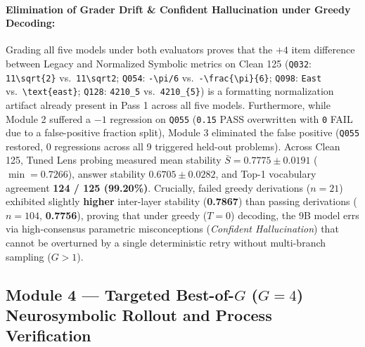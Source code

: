 \documentclass[11pt,a4paper]{article}
\begin{document}
\paragraph{Elimination of Grader Drift \& Confident Hallucination under Greedy Decoding:}
Grading all five models under both evaluators proves that the $+4$ item difference between Legacy and Normalized Symbolic metrics on Clean 125 (\texttt{Q032}: \texttt{11\textbackslash sqrt\{2\}} vs.\ \texttt{11\textbackslash sqrt2}; \texttt{Q054}: \texttt{-\textbackslash pi/6} vs.\ \texttt{-\textbackslash frac\{\textbackslash pi\}\{6\}}; \texttt{Q098}: \texttt{East} vs.\ \texttt{\textbackslash text\{east\}}; \texttt{Q128}: \texttt{4210\_5} vs.\ \texttt{4210\_\{5\}}) is a formatting normalization artifact already present in Pass 1 across all five models. Furthermore, while Module 2 suffered a $-1$ regression on \texttt{Q055} (\texttt{0.15} PASS overwritten with \texttt{0} FAIL due to a false-positive fraction split), Module 3 eliminated the false positive (\texttt{Q055} restored, 0 regressions across all 9 triggered held-out problems). Across Clean 125, Tuned Lens probing measured mean stability $\bar{S} = 0.7775 \pm 0.0191$ ($\min = 0.7266$), answer stability $0.6705 \pm 0.0282$, and Top-1 vocabulary agreement \textbf{124 / 125 (99.20\%)}. Crucially, failed greedy derivations ($n=21$) exhibited slightly \textbf{higher} inter-layer stability (\textbf{0.7867}) than passing derivations ($n=104$, \textbf{0.7756}), proving that under greedy ($T=0$) decoding, the 9B model errs via high-consensus parametric misconceptions (\textit{Confident Hallucination}) that cannot be overturned by a single deterministic retry without multi-branch sampling ($G > 1$).

\subsection{Module 4 --- Targeted Best-of-$G$ ($G=4$) Neurosymbolic Rollout and Process Verification}
\end{document}
